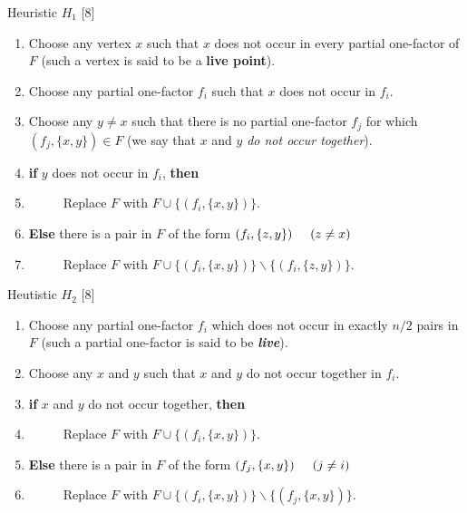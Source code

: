 \documentclass[
  12pt,
  a4paper]{book}
\begin{document}
Heuristic \(H_1\) {[}8{]}

\begin{enumerate}
\def\labelenumi{\arabic{enumi}.}
\item
  Choose any vertex \(x\) such that \(x\) does not occur in every
  partial one-factor of \(F\) (such a vertex is said to be a
  \textbf{live point}).
\item
  Choose any partial one-factor \(f_i\) such that \(x\) does not occur
  in \(f_i\).
\item
  Choose any \(y \neq x\) such that there is no partial one-factor
  \(f_j\) for which \((f_j,\{x,y\}) \in F\) (we say that \(x\) and \(y\)
  \emph{do not occur together}).
\item
  \textbf{if} \(y\) does not occur in \(f_i\), \textbf{then}
\item
  \(\hspace{1cm}\) Replace \(F\) with \(F \cup \{(f_i,\{x,y\})\}\).
\item
  \textbf{Else} there is a pair in \(F\) of the form
  \((f_i,\{z,y\}) \hspace{0.5cm} (z \neq x)\)
\item
  \(\hspace{1cm}\) Replace \(F\) with
  \(F \cup \{(f_i,\{x,y\})\} \backslash  \{(f_i,\{z,y\})\}\).
\end{enumerate}

Heutistic \(H_2\) {[}8{]}

\begin{enumerate}
\def\labelenumi{\arabic{enumi}.}
\item
  Choose any partial one-factor \(f_i\) which does not occur in exactly
  \(n/2\) pairs in \(F\) (such a partial one-factor is said to be
  \textbf{\emph{live}}).
\item
  Choose any \(x\) and \(y\) such that \(x\) and \(y\) do not occur
  together in \(f_i\).
\item
  \textbf{if} \(x\) and \(y\) do not occur together, \textbf{then}
\item
  \(\hspace{1cm}\) Replace \(F\) with \(F \cup \{(f_i,\{x,y\})\}\).
\item
  \textbf{Else} there is a pair in \(F\) of the form
  \((f_j,\{x,y\}) \hspace{0.5cm} (j \neq i)\)
\item
  \(\hspace{1cm}\) Replace \(F\) with
  \(F \cup \{(f_i,\{x,y\})\} \backslash  \{(f_j,\{x,y\})\}\).
\end{enumerate}
\end{document}
